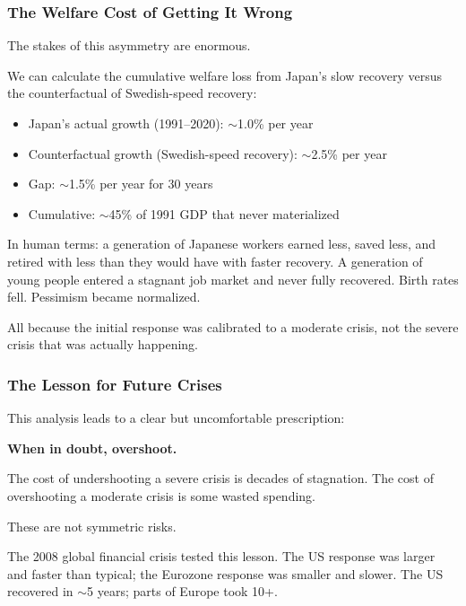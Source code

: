\subsubsection{The Welfare Cost of Getting It Wrong}

The stakes of this asymmetry are enormous.

We can calculate the cumulative welfare loss from Japan's slow recovery 
versus the counterfactual of Swedish-speed recovery:

\begin{itemize}
    \item Japan's actual growth (1991--2020): $\sim$1.0\% per year
    \item Counterfactual growth (Swedish-speed recovery): $\sim$2.5\% per year
    \item Gap: $\sim$1.5\% per year for 30 years
    \item Cumulative: $\sim$45\% of 1991 GDP that never materialized
\end{itemize}

In human terms: a generation of Japanese workers earned less, saved less, 
and retired with less than they would have with faster recovery. A generation 
of young people entered a stagnant job market and never fully recovered. 
Birth rates fell. Pessimism became normalized.

All because the initial response was calibrated to a moderate crisis, 
not the severe crisis that was actually happening.

\subsubsection{The Lesson for Future Crises}

This analysis leads to a clear but uncomfortable prescription:

\begin{tcolorbox}[colback=gray!10!white, colframe=gray!75!black]
\textbf{When in doubt, overshoot.}

The cost of undershooting a severe crisis is decades of stagnation.
The cost of overshooting a moderate crisis is some wasted spending.

These are not symmetric risks.
\end{tcolorbox}

The 2008 global financial crisis tested this lesson. The US response 
was larger and faster than typical; the Eurozone response was smaller 
and slower. The US recovered in $\sim$5 years; parts of Europe took 10+.

